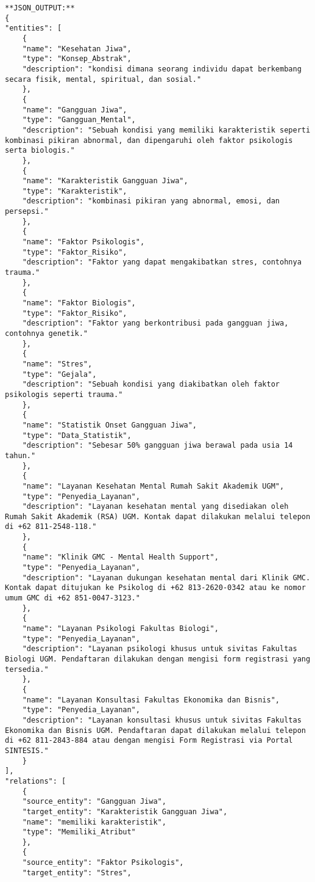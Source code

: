 \begin{lstlisting}[numbers=none]
**JSON_OUTPUT:**
{
"entities": [
    {
    "name": "Kesehatan Jiwa",
    "type": "Konsep_Abstrak",
    "description": "kondisi dimana seorang individu dapat berkembang secara fisik, mental, spiritual, dan sosial."
    },
    {
    "name": "Gangguan Jiwa",
    "type": "Gangguan_Mental",
    "description": "Sebuah kondisi yang memiliki karakteristik seperti kombinasi pikiran abnormal, dan dipengaruhi oleh faktor psikologis serta biologis."
    },
    {
    "name": "Karakteristik Gangguan Jiwa",
    "type": "Karakteristik",
    "description": "kombinasi pikiran yang abnormal, emosi, dan persepsi."
    },
    {
    "name": "Faktor Psikologis",
    "type": "Faktor_Risiko",
    "description": "Faktor yang dapat mengakibatkan stres, contohnya trauma."
    },
    {
    "name": "Faktor Biologis",
    "type": "Faktor_Risiko",
    "description": "Faktor yang berkontribusi pada gangguan jiwa, contohnya genetik."
    },
    {
    "name": "Stres",
    "type": "Gejala",
    "description": "Sebuah kondisi yang diakibatkan oleh faktor psikologis seperti trauma."
    },
    {
    "name": "Statistik Onset Gangguan Jiwa",
    "type": "Data_Statistik",
    "description": "Sebesar 50% gangguan jiwa berawal pada usia 14 tahun."
    },
    {
    "name": "Layanan Kesehatan Mental Rumah Sakit Akademik UGM",
    "type": "Penyedia_Layanan",
    "description": "Layanan kesehatan mental yang disediakan oleh Rumah Sakit Akademik (RSA) UGM. Kontak dapat dilakukan melalui telepon di +62 811-2548-118."
    },
    {
    "name": "Klinik GMC - Mental Health Support",
    "type": "Penyedia_Layanan",
    "description": "Layanan dukungan kesehatan mental dari Klinik GMC. Kontak dapat ditujukan ke Psikolog di +62 813-2620-0342 atau ke nomor umum GMC di +62 851-0047-3123."
    },
    {
    "name": "Layanan Psikologi Fakultas Biologi",
    "type": "Penyedia_Layanan",
    "description": "Layanan psikologi khusus untuk sivitas Fakultas Biologi UGM. Pendaftaran dilakukan dengan mengisi form registrasi yang tersedia."
    },
    {
    "name": "Layanan Konsultasi Fakultas Ekonomika dan Bisnis",
    "type": "Penyedia_Layanan",
    "description": "Layanan konsultasi khusus untuk sivitas Fakultas Ekonomika dan Bisnis UGM. Pendaftaran dapat dilakukan melalui telepon di +62 811-2843-884 atau dengan mengisi Form Registrasi via Portal SINTESIS."
    }
],
"relations": [
    {
    "source_entity": "Gangguan Jiwa",
    "target_entity": "Karakteristik Gangguan Jiwa",
    "name": "memiliki karakteristik",
    "type": "Memiliki_Atribut"
    },
    {
    "source_entity": "Faktor Psikologis",
    "target_entity": "Stres",

\end{lstlisting}
